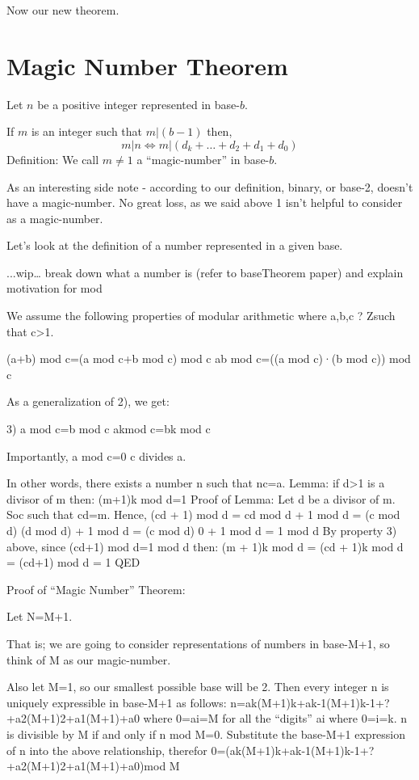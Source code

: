 \documentclass{article}
\newenvironment{jprIn}{\begin{adjustwidth}{2em}{}}{\end{adjustwidth}}
\begin{document}
\bigskip
Now our new theorem.

\section*{Magic Number Theorem}
\begin{jprIn}
Let $n$ be a positive integer represented in base-$b$.

If $m$ is an integer such that $m\big|(b-1)$ then,
\[m\big|n \Leftrightarrow m\big|(d_k+\dots+d_2+d_1+d_0)\]
Definition: We call $m\ne1$ a ``magic-number'' in base-$b$.
\end{jprIn}
\bigskip

As an interesting side note - according to our definition, binary,
or base-2, doesn't have a magic-number.
No great loss, as we said above 1 isn't helpful to consider as a magic-number. 

Let's look at the definition of a number represented in a given base.

...wip…
break down what a number is (refer to baseTheorem paper) and explain motivation for mod

We assume the following properties of modular arithmetic where a,b,c ? Zsuch that c>1.

(a+b) mod c=(a mod c+b mod c) mod c
ab mod c=((a mod c)·(b mod c)) mod c

As a generalization of 2), we get:

3) a mod c=b mod c akmod c=bk mod c

Importantly, a mod c=0 c divides a.

In other words, there exists a number n such that nc=a.
Lemma:
if d>1 is a divisor of m then:
(m+1)k mod d=1
Proof of Lemma:
Let d be a divisor of m. Soc such that cd=m.
Hence, (cd + 1) mod d = cd mod d + 1 mod d
= (c mod d) (d mod d) + 1 mod d
= (c mod d) 0 + 1 mod d
= 1 mod d
By property 3) above, since (cd+1) mod d=1 mod d then:
(m + 1)k mod d
= (cd + 1)k mod d
= (cd+1) mod d
= 1
QED

Proof of ``Magic Number'' Theorem:

Let N=M+1.

That is; we are going to consider representations of numbers in base-M+1, so think of M as our magic-number.

Also let M=1, so our smallest possible base will be 2.
Then every integer n is uniquely expressible in base-M+1 as follows:
n=ak(M+1)k+ak-1(M+1)k-1+?+a2(M+1)2+a1(M+1)+a0
where 0=ai=M for all the ``digits'' ai where 0=i=k.
n is divisible by M if and only if n mod M=0. 
Substitute the base-M+1 expression of n into the above relationship, therefor
0=(ak(M+1)k+ak-1(M+1)k-1+?+a2(M+1)2+a1(M+1)+a0)mod M
\end{document}
